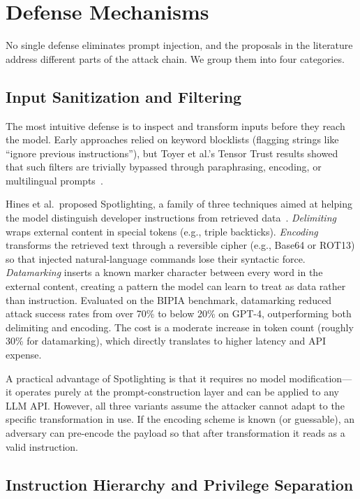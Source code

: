 \section{Defense Mechanisms}
\label{sec:defenses}

No single defense eliminates prompt injection, and the proposals in the literature address different parts of the attack chain. We group them into four categories.

\subsection{Input Sanitization and Filtering}

The most intuitive defense is to inspect and transform inputs before they reach the model. Early approaches relied on keyword blocklists (flagging strings like ``ignore previous instructions''), but Toyer et al.'s Tensor Trust results showed that such filters are trivially bypassed through paraphrasing, encoding, or multilingual prompts~\cite{toyer2024tensor}.

Hines et al.\ proposed Spotlighting, a family of three techniques aimed at helping the model distinguish developer instructions from retrieved data~\cite{hines2024spotlighting}. \emph{Delimiting} wraps external content in special tokens (e.g., triple backticks). \emph{Encoding} transforms the retrieved text through a reversible cipher (e.g., Base64 or ROT13) so that injected natural-language commands lose their syntactic force. \emph{Datamarking} inserts a known marker character between every word in the external content, creating a pattern the model can learn to treat as data rather than instruction. Evaluated on the BIPIA benchmark, datamarking reduced attack success rates from over 70\% to below 20\% on GPT-4, outperforming both delimiting and encoding. The cost is a moderate increase in token count (roughly 30\% for datamarking), which directly translates to higher latency and API expense.

A practical advantage of Spotlighting is that it requires no model modification---it operates purely at the prompt-construction layer and can be applied to any LLM API. However, all three variants assume the attacker cannot adapt to the specific transformation in use. If the encoding scheme is known (or guessable), an adversary can pre-encode the payload so that after transformation it reads as a valid instruction.

\subsection{Instruction Hierarchy and Privilege Separation}

